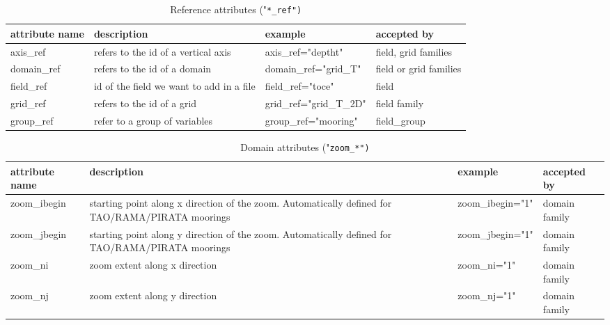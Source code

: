 \documentclass[../main/NEMO_manual]{subfiles}
\begin{document}
\begin{table}
  \scriptsize
  \begin{tabularx}{\textwidth}{|l|X|l|l|}
    \hline
    attribute name                           &
    description                              &
    example                                  &
    accepted by            \\
    \hline
    \hline
    axis\_ref                                &
    refers to the id of a vertical axis      &
    axis\_ref="deptht"                       &
    field, grid families   \\
    \hline
    domain\_ref                              &
    refers to the id of a domain             &
    domain\_ref="grid\_T"                    &
    field or grid families \\
    \hline
    field\_ref                               &
    id of the field we want to add in a file &
    field\_ref="toce"                        &
    field                  \\
    \hline
    grid\_ref                                &
    refers to the id of a grid               &
    grid\_ref="grid\_T\_2D"                  &
    field family           \\
    \hline
    group\_ref                               &
    refer to a group of variables            &
    group\_ref="mooring"                     &
    field\_group           \\
    \hline
  \end{tabularx}
  \caption{Reference attributes ("\tt{*\_ref}")}
\end{table}

\begin{table}
  \scriptsize
  \begin{tabularx}{\textwidth}{|l|X|l|l|}
    \hline
    attribute name                                     &
    description                                        &
    example                                            &
    accepted by   \\
    \hline
    \hline
    zoom\_ibegin                                       &
    starting point along x direction of the zoom.
    Automatically defined for TAO/RAMA/PIRATA moorings &
    zoom\_ibegin="1"                                   &
    domain family \\
    \hline
    zoom\_jbegin                                       &
    starting point along y direction of the zoom.
    Automatically defined for TAO/RAMA/PIRATA moorings &
    zoom\_jbegin="1"                                   &
    domain family \\
    \hline
    zoom\_ni                                           &
    zoom extent along x direction                      &
    zoom\_ni="1"                                       &
    domain family \\
    \hline
    zoom\_nj                                           &
    zoom extent along y direction                      &
    zoom\_nj="1"                                       &
    domain family \\
    \hline
  \end{tabularx}
  \caption{Domain attributes ("\tt{zoom\_*}")}
\end{table}
\end{document}
